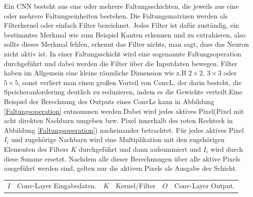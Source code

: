 \documentclass[12pt,a4paper]{scrartcl}
\numberwithin{equation}{section}
\begin{document}
Ein \ac{CNN} besteht aus eine oder mehrere Faltungsschichten, die jeweils aus eine oder mehrere Faltungseinheiten bestehen. Die Faltungsmatrizen werden als Filterkernel oder einfach Filter bezeichnet. Jedes Filter ist dafür zuständig, ein bestimmtes Merkmal wie zum Beispiel Kanten erkennen und zu extrahieren, also sollte dieses Merkmal fehlen, erkennt das Filter nichts, man sagt, dass das Neuron nicht aktiv ist. In einer Faltungsschicht wird eine sogenannte Faltungsoperation durchgeführt und dabei werden die Filter über die Inputdaten bewegen. Filter haben im Allgemein eine kleine räumliche Dimension wie z.B $ 2\times 2 $, $3 \times3 $  oder  $5 \times 5$, sonst verliert man einen großen Vorteil von \ac{ConvL}, der darin besteht, die Speicheranforderung deutlich zu reduzieren, indem es die Gewichte verteilt.Eine Beispiel der Berechnung des Outputs eines \ac{ConvL}s kann in Abbildung \ref{Faltungsoperation} entnommen werden.Dabei wird jedes aktives Pixel(Pixel mit acht direkten Nachbarn umgeben bzw. Pixel innerhalb des roten Rechteck in Abbildung \ref{Faltungsoperation}) nacheinander betrachtet. Für jedes aktives Pixel $ I_i $ und zugehörige Nachbarn wird eine Multiplikation mit den zugehörigen Elementen des Filters $ K $ durchgeführt und dann aufsummiert und $ I_i $ wird durch diese Summe ersetzt. Nachdem alle dieser Berechnungen über alle aktive Pixels ausgeführt werden sind, gelten nur die aktiven Pixels als Ausgabe der Schicht.

\begin{center}
	\begin{tabular}{r@{: }l r@{: }l r@{: }l}
		$I$ & Conv-Layer Eingabedaten. & $K$ & Kernel/Filter& $ O $ &Conv-Layer Output.
	\end{tabular}
\end{center}
\end{document}
